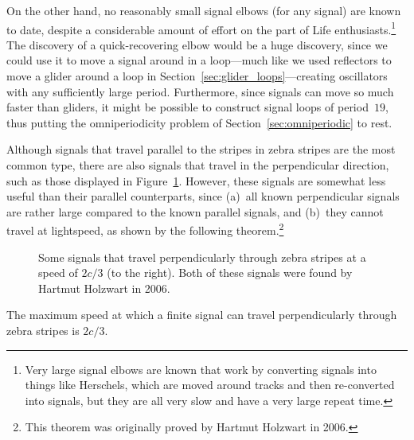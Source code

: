 On the other hand, no reasonably small signal elbows (for any signal) are known to date, despite a considerable amount of effort on the part of Life enthusiasts.\footnote{Very large signal elbows are known that work by converting signals into things like Herschels, which are moved around tracks and then re-converted into signals, but they are all very slow and have a very large repeat time.} The discovery of a quick-recovering elbow would be a huge discovery, since we could use it to move a signal around in a loop---much like we used reflectors to move a glider around a loop in Section~\ref{sec:glider_loops}---creating oscillators with any sufficiently large period. Furthermore, since signals can move so much faster than gliders, it might be possible to construct signal loops of period~$19$, thus putting the omniperiodicity problem of Section~\ref{sec:omniperiodic} to rest.

Although signals that travel parallel to the stripes in zebra stripes are the most common type, there are also signals that travel in the perpendicular direction, such as those displayed in Figure~\ref{fig:zebra_signal_perpendicular}. However, these signals are somewhat less useful than their parallel counterparts, since (a)~all known perpendicular signals are rather large compared to the known parallel signals, and (b)~they cannot travel at lightspeed, as shown by the following theorem.\footnote{This theorem was originally proved by Hartmut Holzwart in 2006.}

\begin{figure}[!htb]
	\centering{}
	\caption{Some signals that travel perpendicularly through zebra stripes at a speed of $2c/3$ (to the right). Both of these signals were found by Hartmut Holzwart in 2006.}\label{fig:zebra_signal_perpendicular}
\end{figure}

\begin{theorem}\label{thm:speed_limit_zebra}
	The maximum speed at which a finite signal can travel perpendicularly through zebra stripes is $2c/3$.
\end{theorem}

